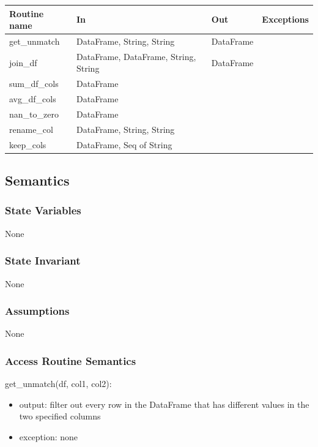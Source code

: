 \documentclass[12pt]{article}
\begin{document}
\begin{tabular}{| l | l | l | p{5cm} |}
\hline
\textbf{Routine name} & \textbf{In} & \textbf{Out} & \textbf{Exceptions}\\
\hline
get\_unmatch & DataFrame, String, String & DataFrame & \\
\hline
join\_df & DataFrame, DataFrame, String, String & DataFrame & \\
\hline
sum\_df\_cols & DataFrame & & \\
\hline
avg\_df\_cols & DataFrame &  & \\
\hline
nan\_to\_zero & DataFrame&  & \\
\hline
rename\_col & DataFrame, String, String &  & \\
\hline
keep\_cols & DataFrame, Seq of String &  & \\
\hline

\end{tabular}

\subsection* {Semantics}

\subsubsection* {State Variables}

None

\subsubsection* {State Invariant}

None

\subsubsection* {Assumptions}

None

\subsubsection* {Access Routine Semantics}

\noindent get\_unmatch(df, col1, col2):
\begin{itemize}
    \item output: filter out every row in the DataFrame that has different values in the two specified columns
    \item exception: none
\end{itemize}
\end{document}

